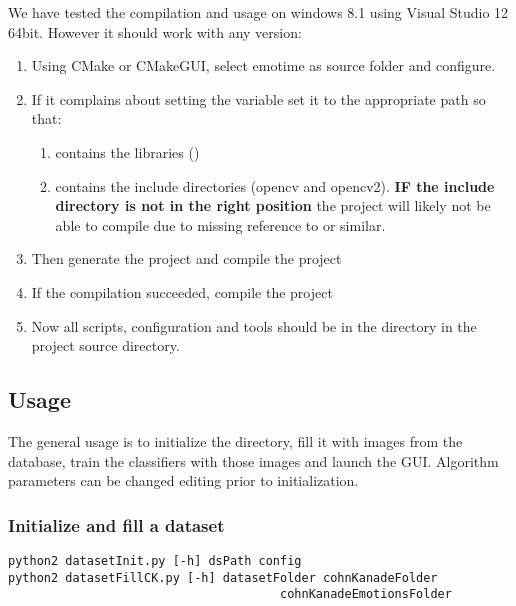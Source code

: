 We have tested the compilation and usage on windows 8.1 using Visual Studio 12
64bit. However it should work with any version:

\begin{enumerate}
  \item Using CMake or CMakeGUI, select emotime as source folder and configure.
  \item If it complains about setting the variable  set it to the appropriate path so that:
    \begin{enumerate}
      \item {} contains the libraries ()
      \item {} contains the include
        directories (opencv and opencv2). \textbf{IF the include directory is
        not in the right position} the project will likely not be able to
        compile due to missing reference to  or similar.
    \end{enumerate}
  \item Then generate the project and compile the project 
  \item If the compilation succeeded, compile the project 
  \item Now all scripts, configuration and tools should be in the directory
     in the project source directory.
\end{enumerate}

\subsection{Usage}

The general usage is to initialize the  directory, fill it with
images from the  database, train the classifiers with those images and
launch the GUI\@. Algorithm parameters can be changed editing
 prior to initialization.

\subsubsection*{Initialize and fill a dataset}

\begin{verbatim}
python2 datasetInit.py [-h] dsPath config
python2 datasetFillCK.py [-h] datasetFolder cohnKanadeFolder
                                      cohnKanadeEmotionsFolder
\end{verbatim}

